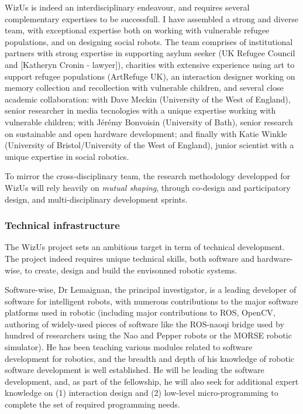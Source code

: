 \documentclass[11pt]{article}
\newcommand{\project}{WizUs\xspace}
\begin{document}
\project is indeed an interdisciplinary endeavour, and requires several
complementary expertises to be successfull. I have assembled a strong and
diverse team, with exceptional expertise both on working with vulnerable refugee
populations, and on designing social robots. The team comprises of institutional
partners with strong expertise in supporting asylum seeker (UK Refugee Council
and [Katheryn Cronin - lawyer]), charities with extensive experience using art
to support refugee populations (ArtRefuge UK), an interaction designer working
on memory collection and recollection with vulnerable children, and several
close academic collaboration: with Dave Meckin (University of the West of
England), senior researcher in media tecnologies with a unique expertise working
with vulnerable children; with Jérémy Bonvoisin (University of Bath), senior
research on sustainable and open hardware development; and finally with Katie
Winkle (University of Bristol/University of the West of England), junior
scientist with a unique expertise in social robotics.

To mirror the cross-disciplinary team, the research methodology developped for
\project will rely heavily on \emph{mutual shaping}, through co-design and
participatory design, and multi-disciplinary development sprints.

\subsubsection{Technical infrastructure}

The \project project sets an ambitious target in term of technical development.
The project indeed requires unique technical skills, both software and
hardware-wise, to create, design and build the envisonned robotic systems.

Software-wise, Dr Lemaignan, the principal investigator, is a leading
developer of software for intelligent robots, with numerous contributions to
the major software platforms used in robotic (including major contributions to
ROS, OpenCV, authoring of widely-used pieces of software like the ROS-naoqi
bridge used by hundred of researchers using the Nao and Pepper robots or the
MORSE robotic simulator). He has been teaching various modules related to
software development for robotics, and the breadth and depth of his knowledge of
robotic software development is well established. He will be leading the
software development, and, as part of the fellowship, he will also seek for
additional expert knowledge on (1) interaction design and (2) low-level
micro-programming to complete the set of required programming needs.
\end{document}
